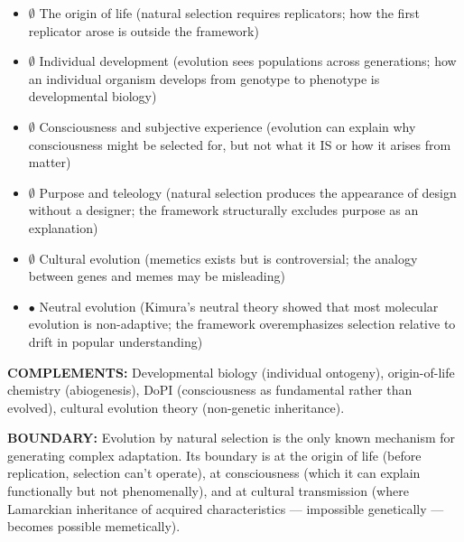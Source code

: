\begin{itemize}[nosep,leftmargin=*]
  \item $\emptyset$ The origin of life (natural selection requires replicators; how the first replicator arose is outside the framework)
  \item $\emptyset$ Individual development (evolution sees populations across generations; how an individual organism develops from genotype to phenotype is developmental biology)
  \item $\emptyset$ Consciousness and subjective experience (evolution can explain why consciousness might be selected for, but not what it IS or how it arises from matter)
  \item $\emptyset$ Purpose and teleology (natural selection produces the appearance of design without a designer; the framework structurally excludes purpose as an explanation)
  \item $\emptyset$ Cultural evolution (memetics exists but is controversial; the analogy between genes and memes may be misleading)
  \item $\bullet$ Neutral evolution (Kimura's neutral theory showed that most molecular evolution is non-adaptive; the framework overemphasizes selection relative to drift in popular understanding)
\end{itemize}


\textbf{COMPLEMENTS:} Developmental biology (individual ontogeny), origin-of-life chemistry (abiogenesis), DoPI (consciousness as fundamental rather than evolved), cultural evolution theory (non-genetic inheritance).


\textbf{BOUNDARY:} Evolution by natural selection is the only known mechanism for generating complex adaptation. Its boundary is at the origin of life (before replication, selection can't operate), at consciousness (which it can explain functionally but not phenomenally), and at cultural transmission (where Lamarckian inheritance of acquired characteristics — impossible genetically — becomes possible memetically).


